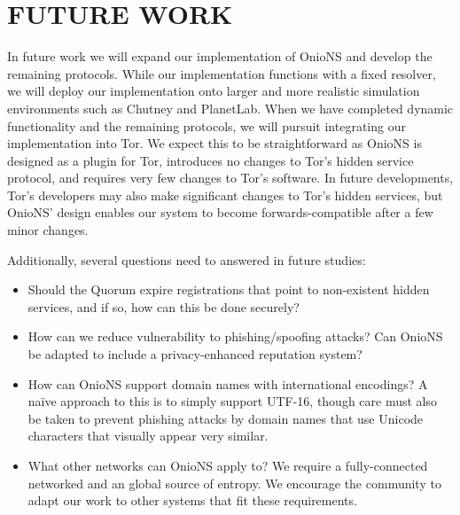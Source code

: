 
\chapter{FUTURE WORK}

In future work we will expand our implementation of OnioNS and develop the remaining protocols. While our implementation functions with a fixed resolver, we will deploy our implementation onto larger and more realistic simulation environments such as Chutney and PlanetLab. When we have completed dynamic functionality and the remaining protocols, we will pursuit integrating our implementation into Tor. We expect this to be straightforward as OnioNS is designed as a plugin for Tor, introduces no changes to Tor's hidden service protocol, and requires very few changes to Tor's software. In future developments, Tor's developers may also make significant changes to Tor's hidden services, but OnioNS' design enables our system to become forwards-compatible after a few minor changes.

Additionally, several questions need to answered in future studies:

\begin{itemize}
	\item Should the Quorum expire registrations that point to non-existent hidden services, and if so, how can this be done securely?
	\item How can we reduce vulnerability to phishing/spoofing attacks? Can OnioNS be adapted to include a privacy-enhanced reputation system?
	\item How can OnioNS support domain names with international encodings? A na\"{i}ve approach to this is to simply support UTF-16, though care must also be taken to prevent phishing attacks by domain names that use Unicode characters that visually appear very similar.
	\item What other networks can OnioNS apply to? We require a fully-connected networked and an global source of entropy. We encourage the community to adapt our work to other systems that fit these requirements.
\end{itemize}